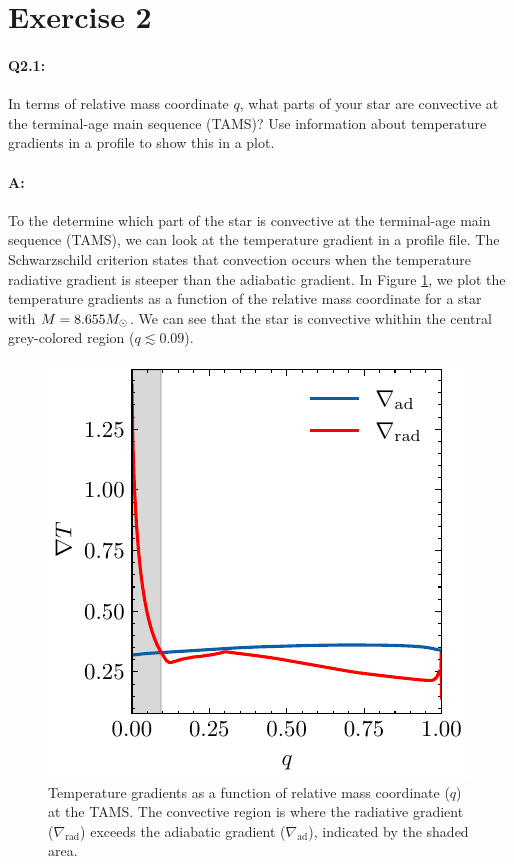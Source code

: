 \documentclass[twocolumn,fontsize=11pt]{scrartcl}
\begin{document}
\section*{Exercise 2}

\paragraph{Q2.1:} In terms of relative mass coordinate \(q\), what parts of your star are convective at the terminal-age main sequence (TAMS)? Use information about temperature gradients in
a profile to show this in a plot.

\paragraph{A:} To the determine which part of the star is convective at the terminal-age main sequence (TAMS), we can look at the temperature gradient in a profile file. The Schwarzschild criterion states that convection occurs when the temperature radiative gradient is steeper than the adiabatic gradient. In Figure \ref{fig:q21_convective_regions}, we plot the temperature gradients as a function of the relative mass coordinate for a star with \(M = 8.655M_\odot\). We can see that the star is convective whithin the central grey-colored region (\(q \lesssim 0.09\)).

\begin{figure}[htbp]
    \centering
    \includegraphics{q21_grad.pdf}
    \caption{Temperature gradients as a function of relative mass coordinate (\(q\)) at the TAMS. The convective region is where the radiative gradient (\(\nabla_{\text{rad}}\)) exceeds the adiabatic gradient (\(\nabla_{\text{ad}}\)), indicated by the shaded area.}
    \label{fig:q21_convective_regions}
\end{figure}
\end{document}
